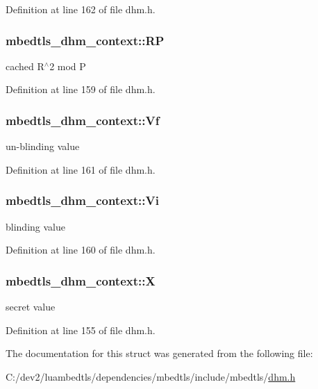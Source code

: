 Definition at line 162 of file dhm.\-h.

\hypertarget{structmbedtls__dhm__context_ae1801da339af972ee271f947b3fe3734}{
\subsubsection[{R\-P}]{ mbedtls\-\_\-dhm\-\_\-context\-::\-R\-P}}\label{structmbedtls__dhm__context_ae1801da339af972ee271f947b3fe3734}
cached R$^\wedge$2 mod P 

Definition at line 159 of file dhm.\-h.

\hypertarget{structmbedtls__dhm__context_a1ebf1105240ca26820edb81f41dd6180}{
\subsubsection[{Vf}]{ mbedtls\-\_\-dhm\-\_\-context\-::\-Vf}}\label{structmbedtls__dhm__context_a1ebf1105240ca26820edb81f41dd6180}
un-\/blinding value 

Definition at line 161 of file dhm.\-h.

\hypertarget{structmbedtls__dhm__context_a21fea3aadf6f05d8aa42c79e55c5d98c}{
\subsubsection[{Vi}]{ mbedtls\-\_\-dhm\-\_\-context\-::\-Vi}}\label{structmbedtls__dhm__context_a21fea3aadf6f05d8aa42c79e55c5d98c}
blinding value 

Definition at line 160 of file dhm.\-h.

\hypertarget{structmbedtls__dhm__context_a175e534f5a3a4483ebcc4d7ec852d4cd}{
\subsubsection[{X}]{ mbedtls\-\_\-dhm\-\_\-context\-::\-X}}\label{structmbedtls__dhm__context_a175e534f5a3a4483ebcc4d7ec852d4cd}
secret value 

Definition at line 155 of file dhm.\-h.



The documentation for this struct was generated from the following file\-:\begin{DoxyCompactItemize}
\item 
C\-:/dev2/luambedtls/dependencies/mbedtls/include/mbedtls/\hyperlink{dhm_8h}{dhm.\-h}\end{DoxyCompactItemize}
